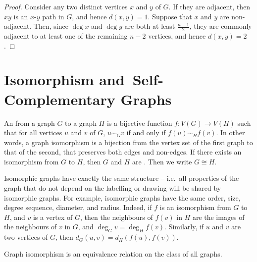 \begin{proof}
Consider any two distinct vertices $x$ and $y$ of $G$. If they are adjacent, then $xy$ is an $x$-$y$ path in $G$, and hence $d(x, y) = 1$. Suppose that $x$ and $y$ are non-adjacent. Then, since $\deg x$ and $\deg y$ are both at least $\frac{n-1}{2}$, they are commonly adjacent to at least one of the remaining $n - 2$ vertices, and hence $d(x, y) = 2$.
\end{proof}

\section[Isomorphism and Self-Complementary Graphs]{Isomorphism and~\screenbreak Self-Complementary Graphs}\label{sec:IsomorphismSelfComplementary}

An  from a graph $G$ to a graph $H$ is a bijective function $f \colon V(G) \to V(H)$ such that for all vertices $u$ and $v$ of $G$, $u \sim_G v$ if and only if $f(u) \sim_H f(v)$. In other words, a graph isomorphism is a bijection from the vertex set of the first graph to that of the second, that preserves both edges and non-edges. If there exists an isomorphism from $G$ to $H$, then $G$ and $H$ are . Then we write $G \cong H$.

Isomorphic graphs have exactly the same structure -- i.e.\ all properties of the graph that do not depend on the labelling or drawing will be shared by isomorphic graphs. For example, isomorphic graphs have the same order, size, degree sequence, diameter, and radius. Indeed, if $f$ is an isomorphism from $G$ to $H$, and $v$ is a vertex of $G$, then the neighbours of $f(v)$ in $H$ are the images of the neighbours of $v$ in $G$, and $\deg_G v = \deg_H f(v)$. Similarly, if $u$ and $v$ are two vertices of $G$, then $d_G(u, v) = d_H(f(u), f(v))$.

\begin{Theorem}
Graph isomorphism is an equivalence relation on the class of all graphs.
\end{Theorem}

